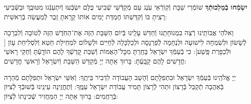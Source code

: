 \documentclass[twoside, openany, parskip=half, 11pt]{book}
\begin{document}
\begin{sometimes}
\textbf{יִשְׂמְֿחוּ בְֿמַלְכוּתְֿךָ}
 שׁוֹמְֿרֵי שַׁבָּת וְֿקֽוֹרְֿאֵי עֹֽנֶג עַם מְֿקַדְּֿשֵׁי שְֿׁבִיעִי כֻּלָּם יִשְׂבְּֿעוּ וְֿיִתְעַנְּֿגוּ מִטּוּבֶֽךָ וּבַשְּֿׁבִיעִי רָצִֽיתָ בּוֹ וְֿקִדַּשְׁתּוֹ חֶמְדַּת יָמִים אוֹתוֹ קָרָֽאתָ זֵֽכֶר לְֿמַעֲשֵׂה בְֿרֵאשִׁית:

 וֵאלֹהֵי אֲבוֹתֵֽינוּ רְֿצֵה בִמְנוּחָתֵֽנוּ וְֿחַדֵּשׁ עָלֵֽינוּ בְּֿיוֹם הַשַּׁבָּת הַזֶּה אֶת־הַחֹֽדֶשׁ הַזֶּה לְֿטוֹבָה וְֿלִבְרָכָה לְֿשָׂשׂוֹן וּלְשִׂמְחָה לִישׁוּעָה וּלְנֶחָמָה לְֿפַרְנָסָה וּלְכַלְכָּלָה לְֿחַיִּים וּלְשָׁלוֹם לִמְחִֽילַת חֵטְא וְֿלִסְלִיחַת עָוֹן [
וּלְֿכַפָּרַת פָּֽשַׁע]: כִּי בְֿעַמְּֿךָ יִשְׂרָאֵל בָּחַֽרְתָּ מִכׇּל־הָאֻמּוֹת וְֿשַׁבַּת קׇדְשְֿׁךָ לָהֶם הוֹדָֽעְֿתָּ וְֿחֻקֵּי רָאשֵׁי חֳדָשִׁים לָהֶם קָבָֽעְֿתָּ: בָּרוּךְ אַתָּה יְיָ מְֿקַדֵּשׁ הַשַּׁבָּת וְֿיִשְׂרָאֵל וְֿרָאשֵׁי חֳדָשִׁים: 

\end{sometimes}

 יְיָ אֱלֹהֵֽינוּ בְּֿעַמְּֿךָ יִשְׂרָאֵל וּבִתְפִלָּתָם וְֿהָשֵׁב הָעֲבוֹדָה לִדְבִיר בֵּיתֶֽךָ: וְֿאִשֵּׁי יִשְׂרָאֵל וּתְפִלָּתָם מְֿהֵרָה בְּֿאַהֲבָה תְֿקַבֵּל בְּֿרָצוֹן וּתְהִי לְֿרָצוֹן תָּמִיד עֲבוֹדַת יִשְׂרָאֵל עַמֶּֽךָ: וְֿתֶחֱזֶֽינָה עֵינֵֽינוּ בְּֿשׁוּבְֿךָ לְֿצִיּוֹן בְּֿרַחֲמִים:
בָּרוּךְ אַתָּה יְיָ הַמַּחֲזִיר שְֿׁכִינָתוֹ לְֿצִיּוֹן:

\modim

\nextpage

\shabboschanukah

\shabboshodos

\vspace{.5\baselineskip}
\end{document}
